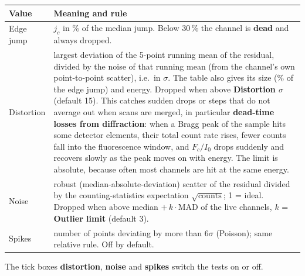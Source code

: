 \documentclass[11pt,a4paper]{article}
\newcommand{\ui}[1]{\textsf{\textbf{#1}}}          %
\begin{document}
\begin{center}
\begin{tabularx}{\linewidth}{@{}lX@{}}
\toprule
Value & Meaning and rule\\
\midrule
Edge jump    & $j_c$ in \% of the median jump. Below 30\,\% the channel is \textbf{dead} and always dropped.\\
Distortion   & largest deviation of the 5-point running mean of the residual, divided by the noise of
               that running mean (from the channel's own point-to-point scatter), i.e.\ in $\sigma$.
               The table also gives its size (\% of the edge jump) and energy.
               Dropped when above \ui{Distortion $\sigma$} (default 15). This catches sudden drops
               or steps that do not average out when scans are merged, in particular \textbf{dead-time
               losses from diffraction}: when a Bragg peak of the sample hits some detector elements,
               their total count rate rises, fewer counts fall into the fluorescence window, and
               $F_c/I_0$ drops suddenly and recovers slowly as the peak moves on with energy.
               The limit is absolute, because often most channels are hit at the same energy.\\
Noise        & robust (median-absolute-deviation) scatter of the residual divided by the
               counting-statistics expectation $\sqrt{\text{counts}}$; 1 = ideal. Dropped when above
               median $+\,k\cdot$MAD of the live channels, $k$ = \ui{Outlier limit} (default 3).\\
Spikes       & number of points deviating by more than $6\sigma$ (Poisson); same relative rule.
               Off by default.\\
\bottomrule
\end{tabularx}
\end{center}
The tick boxes \ui{distortion}, \ui{noise} and \ui{spikes} switch the tests on or off.
\end{document}
